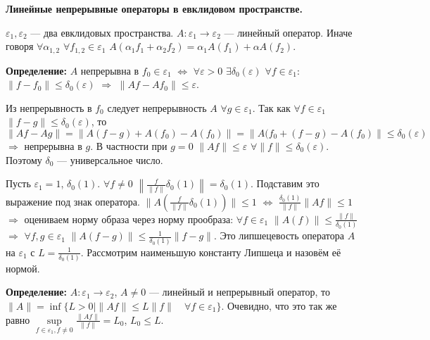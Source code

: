 \documentclass[12pt]{article}
\begin{document}
\begin{center}
    \textbf{Линейные непрерывные операторы в евклидовом пространстве.}
\end{center}

$\varepsilon_1, \varepsilon_2$ --- два евклидовых пространства.
$A : \varepsilon_1 \to \varepsilon_2$ --- линейный оператор.
Иначе говоря $\forall \alpha_{1, 2}$ $\forall f_{1, 2} \in \varepsilon_1$ $A(\alpha_1 f_1 + \alpha_2 f_2) = \alpha_1 A(f_1) + \alpha A(f_2)$.

\textbf{Определение:} $A$ непрерывна в $f_0 \in \varepsilon_1$ $\Leftrightarrow$ $\forall \varepsilon > 0$ $\exists \delta_0(\varepsilon)$
$\forall f \in \varepsilon_1$: $\|f - f_0\| \le \delta_0(\varepsilon)$ $\Rightarrow$ $\|Af-Af_0\| \le \varepsilon$.

Из непрерывность в $f_0$ следует непрерывность $A$ $\forall g \in \varepsilon_1$.
Так как $\forall f \in \varepsilon_1$ $\|f - g\| \le \delta_0(\varepsilon)$, то $\|Af - Ag\| = \|A(f - g) + A(f_0) - A(f_0)\| = \|A(f_0 + (f - g)
- A(f_0)\| \le \delta_0(\varepsilon)$ $\Rightarrow$ непрерывна в $g$.
В частности при $g = 0$ $\|Af\| \le \varepsilon$ $\forall \|f\| \le \delta_0(\varepsilon)$.
Поэтому $\delta_0$ --- универсальное число.

Пусть $\varepsilon_1 = 1$, $\delta_0(1)$.
$\forall f \ne 0$ $\left \| \frac{f}{\|f\|}\delta_0(1)\right \| = \delta_0(1)$.
Подставим это выражение под знак оператора.
$\|A(\frac{f}{\|f\|}\delta_0(1))\| \le 1$ $\Leftrightarrow$ $\frac{\delta_0(1)}{\|f\|}\|Af\| \le 1$ $\Rightarrow$ оцениваем норму образа через норму
прообраза: $\forall f \in \varepsilon_1$ $\|A(f)\| \le \frac{\|f\|}{\delta_0(1)}$ $\Rightarrow$ $\forall f,g \in \varepsilon_1$
$\|A(f-g)\| \le \frac{1}{\delta_0(1)}\|f - g\|$.
Это липшецевость оператора $A$ на $\varepsilon_1$ с $L=\frac{1}{\delta_0(1)}$.
Рассмотрим наименьшую константу Липшеца и назовём её нормой.

\textbf{Определение:} $A : \varepsilon_1 \to \varepsilon_2$, $A \ne 0$ --- линейный и непрерывный оператор, то
$\|A\| = \inf\{L > 0 \mid \|Af\| \le L\|f\| \quad \forall f \in \varepsilon_1\}$.
Очевидно, что это так же равно $\sup\limits_{f \in \varepsilon_1, f \ne 0} \frac {\|Af\|}{\|f\|}=L_0$, $L_0 \le L$.
\end{document}
